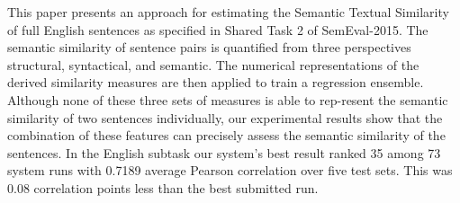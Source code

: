 This paper presents an approach for estimating the Semantic Textual Similarity of full English sentences as specified in Shared Task 2 of SemEval-2015. The semantic similarity of sentence pairs is quantified from three perspectives structural, syntactical, and semantic. The numerical representations of the derived similarity measures are then applied to train a regression ensemble. Although none of these three sets of measures is able to rep-resent the semantic similarity of two sentences individually, our experimental results show that the combination of these features can precisely assess the semantic similarity of the sentences. In the English subtask our system's best result ranked 35 among 73 system runs with 0.7189 average Pearson correlation over five test sets. This was 0.08 correlation points less than the best submitted run.
